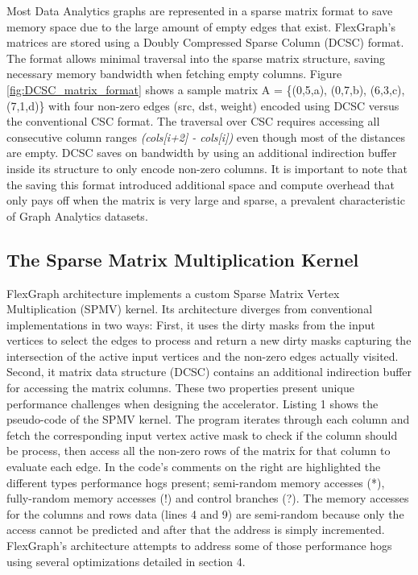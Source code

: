 Most Data Analytics graphs are represented in a sparse matrix format to save memory space due to the large amount of empty edges that exist. FlexGraph's matrices are stored using a Doubly Compressed Sparse Column (DCSC) \cite{DCSC} format. The format allows minimal traversal into the sparse matrix structure, saving necessary memory bandwidth when fetching empty columns. Figure \ref{fig:DCSC_matrix_format} shows a sample matrix A = \{(0,5,a), (0,7,b), (6,3,c), (7,1,d)\} with four non-zero edges (src, dst, weight) encoded using DCSC versus the conventional CSC \cite{CSC} format. The traversal over CSC requires accessing all consecutive column ranges \textit{(cols[i+2] - cols[i])} even though most of the distances are empty. DCSC saves on bandwidth by using an additional indirection  buffer inside its structure to only encode non-zero columns. It is important to note that the saving this format introduced additional space and compute overhead that only pays off when the matrix is very large and sparse, a prevalent characteristic of Graph Analytics datasets.

\subsection{The Sparse Matrix Multiplication Kernel}

FlexGraph architecture implements a custom Sparse Matrix Vertex Multiplication (SPMV) kernel. Its architecture diverges from conventional implementations in two ways: First, it uses the dirty masks from  the input vertices to select the edges to process and return a new dirty masks capturing the intersection of the active input vertices and the non-zero edges actually visited. Second, it matrix data structure (DCSC) contains an additional indirection buffer for accessing the matrix columns. These two properties present unique performance challenges when designing the accelerator. Listing 1 shows the pseudo-code of the SPMV kernel. The program iterates through each column and fetch the corresponding input vertex active mask to check if the column should be process, then access all the non-zero rows of the matrix for that column to evaluate each edge. In the code's comments on the right are highlighted the different types performance hogs present; semi-random memory accesses (*), fully-random memory accesses (!) and control branches (?). The memory accesses for the columns and rows data (lines 4 and 9) are semi-random because only the access cannot be predicted and after that the address is simply incremented. FlexGraph's architecture attempts to address some of those performance hogs using several optimizations detailed in section 4.

